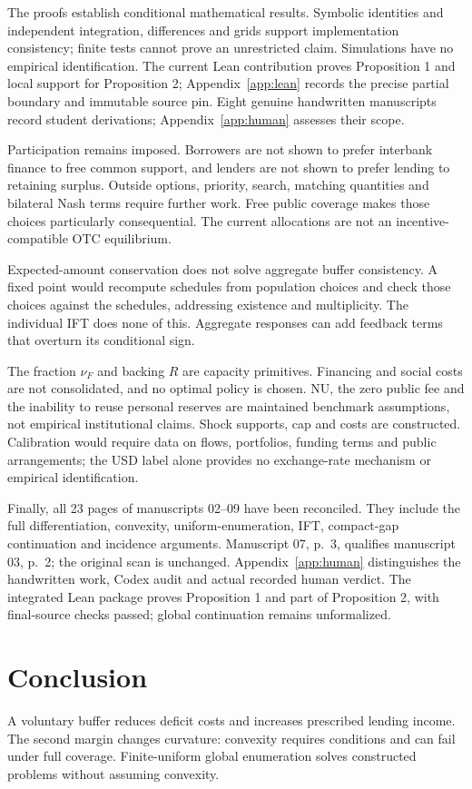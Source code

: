 \documentclass[11pt]{article}
\theoremstyle{definition}
\begin{document}
The proofs establish conditional mathematical results. Symbolic identities and independent integration, differences and grids support implementation consistency; finite tests cannot prove an unrestricted claim. Simulations have no empirical identification. The current Lean contribution proves Proposition 1 and local support for Proposition 2; Appendix~\ref{app:lean} records the precise partial boundary and immutable source pin. Eight genuine handwritten manuscripts record student derivations; Appendix~\ref{app:human} assesses their scope.

Participation remains imposed. Borrowers are not shown to prefer interbank finance to free common support, and lenders are not shown to prefer lending to retaining surplus. Outside options, priority, search, matching quantities and bilateral Nash terms require further work. Free public coverage makes those choices particularly consequential. The current allocations are not an incentive-compatible OTC equilibrium.

Expected-amount conservation does not solve aggregate buffer consistency. A fixed point would recompute schedules from population choices and check those choices against the schedules, addressing existence and multiplicity. The individual IFT does none of this. Aggregate responses can add feedback terms that overturn its conditional sign.

The fraction $\nu_F$ and backing $R$ are capacity primitives. Financing and social costs are not consolidated, and no optimal policy is chosen. NU, the zero public fee and the inability to reuse personal reserves are maintained benchmark assumptions, not empirical institutional claims. Shock supports, cap and costs are constructed. Calibration would require data on flows, portfolios, funding terms and public arrangements; the USD label alone provides no exchange-rate mechanism or empirical identification.

Finally, all 23 pages of manuscripts 02--09 have been reconciled. They include the full differentiation, convexity, uniform-enumeration, IFT, compact-gap continuation and incidence arguments. Manuscript 07, p.~3, qualifies manuscript 03, p.~2; the original scan is unchanged. Appendix~\ref{app:human} distinguishes the handwritten work, Codex audit and actual recorded human verdict. The integrated Lean package proves Proposition 1 and part of Proposition 2, with final-source checks passed; global continuation remains unformalized.

\section{Conclusion}
A voluntary buffer reduces deficit costs and increases prescribed lending income. The second margin changes curvature: convexity requires conditions and can fail under full coverage. Finite-uniform global enumeration solves constructed problems without assuming convexity.
\end{document}
